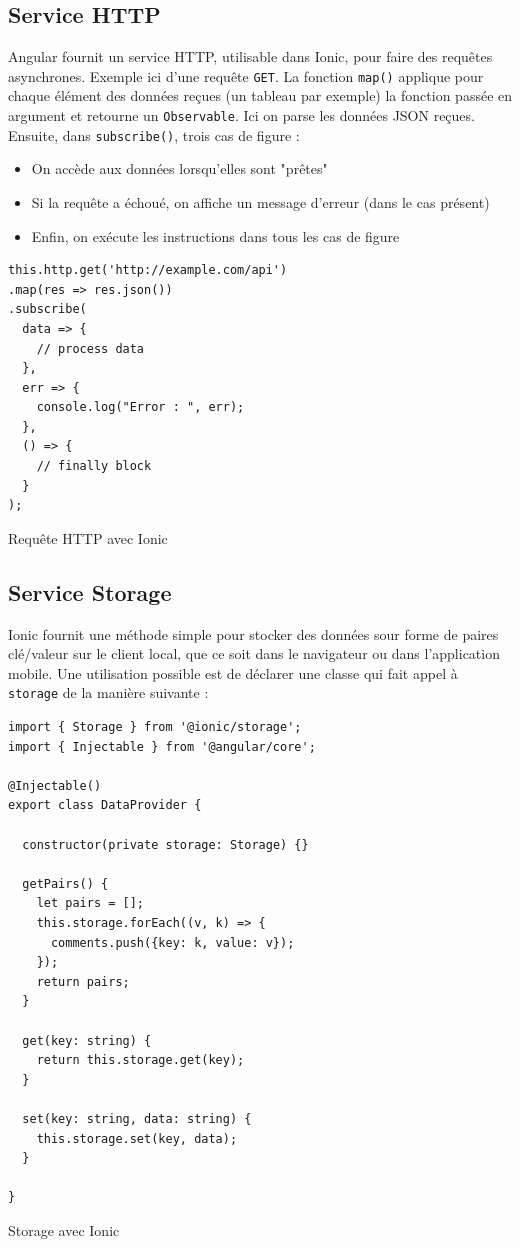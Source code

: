 \documentclass[a4paper, 12pt]{article}
\newenvironment{code}{\captionsetup{type=listing}}{}
\begin{document}
\subsection{Service HTTP}
Angular fournit un service HTTP, utilisable dans Ionic, pour faire des requêtes asynchrones. Exemple ici d'une
requête \texttt{GET}. La fonction \texttt{map()} applique pour chaque élément des données
reçues (un tableau par exemple) la fonction passée en argument et retourne un \texttt{Observable}.
Ici on parse les données JSON reçues. Ensuite, dans \texttt{subscribe()}, trois cas de figure :
\begin{itemize}
    \item On accède aux données lorsqu'elles sont "prêtes"
    \item Si la requête a échoué, on affiche un message d'erreur (dans le cas présent)
    \item Enfin, on exécute les instructions dans tous les cas de figure
\end{itemize}
\begin{code}
    \begin{verbatim}
this.http.get('http://example.com/api')
.map(res => res.json())
.subscribe(
  data => {
    // process data
  },
  err => {
    console.log("Error : ", err);
  },
  () => {
    // finally block
  }
);
    \end{verbatim}
    \caption{Requête HTTP avec Ionic}
\end{code}

\subsection{Service Storage}
Ionic fournit une méthode simple pour stocker des données sour forme de paires clé/valeur sur le client local,
que ce soit dans le navigateur ou dans l'application mobile. Une utilisation possible est de déclarer une classe
qui fait appel à \texttt{storage} de la manière suivante \cite{ref70} :
\begin{code}
    \begin{verbatim}
import { Storage } from '@ionic/storage';
import { Injectable } from '@angular/core';

@Injectable()
export class DataProvider {

  constructor(private storage: Storage) {}

  getPairs() {
    let pairs = [];
    this.storage.forEach((v, k) => {
      comments.push({key: k, value: v});
    });
    return pairs;
  }

  get(key: string) {
    return this.storage.get(key);
  }

  set(key: string, data: string) {
    this.storage.set(key, data);
  }

}
    \end{verbatim}
    \caption{Storage avec Ionic}
\end{code}
\end{document}
